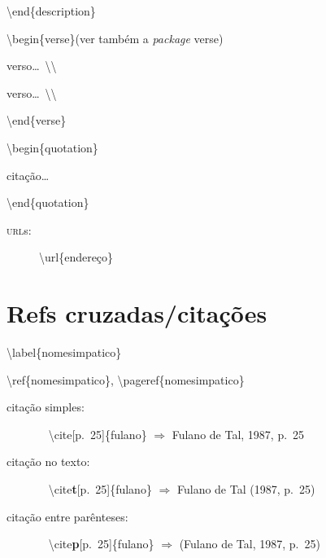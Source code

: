 \documentclass[11pt,twoside,english,brazil]{article}
\begin{document}
\begin{multicols}{3}
\textbackslash{}end\{description\}


\vspace{\baselineskip}


\textbackslash{}begin\{verse\}\quad (ver também a \textit{package} \textsf{verse})

\quad verso\dots\ \textbackslash\textbackslash

\quad verso\dots\ \textbackslash\textbackslash

\textbackslash{}end\{verse\}


\vspace{\baselineskip}


\textbackslash{}begin\{quotation\}

\quad citação\dots

\textbackslash{}end\{quotation\}


\vspace{\baselineskip}


\begin{description}
    \item[\textsc{url}s:] \textbackslash{}url\{endereço\}
\end{description}

\section*{Refs cruzadas/citações}

\textbackslash{}label\{nomesimpatico\}

\textbackslash{}ref\{nomesimpatico\},
\textbackslash{}pageref\{nomesimpatico\}


\vspace{\baselineskip}


\begin{description}
\item[citação simples:]~\vspace{2pt}\newline
    \null\quad\textbackslash{}cite[p.~25]\{fulano\} $\Rightarrow$ Fulano de Tal, 1987, p.~25\vspace{6pt}

  \item[citação no texto:]~\vspace{2pt}\newline
    \null\quad\textbackslash{}cite\textbf{t}[p.~25]\{fulano\} $\Rightarrow$ Fulano de Tal (1987, p.~25)\vspace{6pt}

  \item[citação entre parênteses:]~\vspace{2pt}\newline
    \null\quad\textbackslash{}cite\textbf{p}[p.~25]\{fulano\} $\Rightarrow$ (Fulano de Tal, 1987, p.~25)
\end{description}


\end{multicols}
\end{document}
